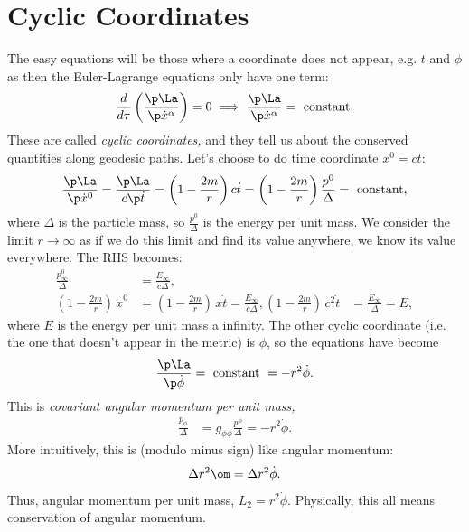 \documentclass[a4paper, 11pt, normalem]{report}
\begin{document}
\section{Cyclic Coordinates}
The easy equations will be those where a coordinate does not appear, e.g. $t$ and $\phi$ as then the Euler-Lagrange equations only have one term:
\begin{align}
    \frac{d}{d\tau}\left(\frac{\p\La}{\p\dot{x}^\alpha}\right) = 0 \implies \frac{\p\La}{\p\dot{x}^\alpha} = \text{ constant}.
\end{align}
These are called \emph{cyclic coordinates,} and they tell us about the conserved quantities along geodesic paths. 
Let's choose to do time coordinate $x^0=ct$:
\begin{align}
    \frac{\p\La}{\p\dot{x}^0} = \frac{\p\La}{c\p\dot{t}} = \left(1-\frac{2m}{r}\right)c\dot{t} = \left(1-\frac{2m}{r}\right)\frac{p^0}{\Delta} = \text{ constant},
\end{align}
where $\Delta$ is the particle mass, so $\frac{p^0}{\Delta}$ is the energy per unit mass. 
We consider the limit $r\to\infty$ as if we do this limit and find its value anywhere, we know its value everywhere. 
The RHS becomes:
\begin{align}
    \frac{p^0_\infty}{\Delta} &= \frac{E_\infty}{c\Delta},\\
    \left(1-\frac{2m}{r}\right)\,\dot{x}^0 &= \left(1-\frac{2m}{r}\right)\,x\dot{t} = \frac{E_\infty}{c\Delta},
    \left(1-\frac{2m}{r}\right)\,c^2\dot{t} &= \frac{E_{\infty}}{\Delta} = E,
\end{align}
where $E$ is the energy per unit mass a infinity.
The other cyclic coordinate (i.e. the one that doesn't appear in the metric) is $\phi$, so the equations have become
\begin{align}
    \frac{\p\La}{\p\dot{\phi}} = \text{ constant } = -r^2\dot{\phi}.
\end{align}
This is \emph{covariant angular momentum per unit mass,}
\begin{align}
    \frac{p_\phi}{\Delta} &= g_{\phi\phi}\frac{p^\phi}{\Delta} = -r^2\dot{\phi}.
\end{align}
More intuitively, this is (modulo minus sign) like angular momentum:
\begin{align}
    \Delta r^2\om = \Delta r^2\dot{\phi}.
\end{align}
Thus, angular momentum per unit mass, $L_2=r^2\dot{\phi}$.
Physically, this all means conservation of angular momentum. 
\end{document}
